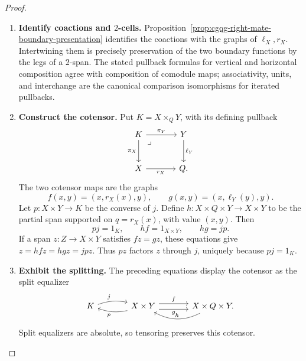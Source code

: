 \documentclass[oneside]{article}
\theoremstyle{plain}
\theoremstyle{definition}
\theoremstyle{remark}
\begin{document}
\begin{proof}
    \leavevmode
    \begin{enumerate}[beginpenalty=10000]
        \item \textbf{Identify coactions and \(2\)-cells.}
        Proposition~\ref{prop:cgqg-right-mate-boundary-presentation}
        identifies the coactions with the graphs of \(\ell_X,r_X\).
        Intertwining them is precisely preservation of the two boundary
        functions by the legs of a \(2\)-span. The stated pullback formulas
        for vertical and horizontal composition agree with composition of
        comodule maps; associativity, units, and interchange are the canonical
        comparison isomorphisms for iterated pullbacks.

        \item \textbf{Construct the cotensor.}
        Put \(K=X\times_QY\), with its defining pullback
        \[
        \begin{tikzcd}[column sep=large,row sep=large]
        K\arrow[r,"\pi_Y"]\arrow[d,"\pi_X"']
          \arrow[dr,phantom,"\lrcorner",very near start]
          &Y\arrow[d,"\ell_Y"]\\
        X\arrow[r,"r_X"']&Q.
        \end{tikzcd}
        \]
        The two cotensor maps are the graphs
        \[
        f(x,y)=(x,r_X(x),y),\qquad
        g(x,y)=(x,\ell_Y(y),y).
        \]
        Let \(p:X\times Y\to K\) be the converse of \(j\). Define
        \(h:X\times Q\times Y\to X\times Y\) to be the partial span
        supported on \(q=r_X(x)\), with value \((x,y)\). Then
        \[
        pj=1_K,\qquad hf=1_{X\times Y},\qquad hg=jp.
        \]
        If a span \(z:Z\to X\times Y\) satisfies \(fz=gz\), these equations give
        \(z=h fz=h gz=jpz\). Thus \(pz\) factors \(z\) through \(j\),
        uniquely because \(pj=1_K\).

        \item \textbf{Exhibit the splitting.}
        The preceding equations display the cotensor as the split equalizer
        \[
        \begin{tikzcd}[column sep=large,row sep=large]
        K\arrow[r,bend left=15,"j"]
          &X\times Y\arrow[l,bend left=15,"p"]
          \arrow[r,shift left=.8ex,"f"]
          \arrow[r,shift right=.8ex,"g"']
          &X\times Q\times Y\arrow[l,bend left=28,"h"'].
        \end{tikzcd}
        \]
        Split equalizers are absolute, so tensoring preserves this cotensor.


\end{enumerate}
\end{proof}
\end{document}
